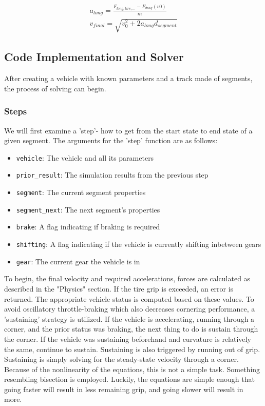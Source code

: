 \documentclass{article}
\begin{document}
\begin{align}
	a_{long} = \frac{F_{long,tire,...} - F_{drag}(v0)}{m} \\
	v_{final} = \sqrt{v_0^2 + 2 a_{long} d_{segment}}
\end{align}


\subsection{Code Implementation and Solver}

After creating a vehicle with known parameters and a track made of segments, the process of solving can begin. 

\subsubsection{Steps}

We will first examine a 'step'- how to get from the start state to end state of a given segment. The arguments for the 'step' function are as follows:

\begin{itemize}
\item \texttt{vehicle}: The vehicle and all its parameters
\item \texttt{prior\_result}: The simulation results from the previous step
\item \texttt{segment}: The current segment properties
\item \texttt{segment\_next}: The next segment's properties
\item \texttt{brake}: A flag indicating if braking is required
\item \texttt{shifting}: A flag indicating if the vehicle is currently shifting inbetween gears
\item \texttt{gear}: The current gear the vehicle is in
\end{itemize}

To begin, the final velocity and required accelerations, forces are calculated as described in the "Physics" section. If the tire grip is exceeded, an error is returned. The appropriate vehicle status is computed based on these values. To avoid oscillatory throttle-braking which also decreases cornering performance, a 'sustaining' strategy is utilized. If the vehicle is accelerating, running through a corner, and the prior status was braking, the next thing to do is sustain through the corner. If the vehicle was sustaining beforehand and curvature is relatively the same, continue to sustain. Sustaining is also triggered by running out of grip. Sustaining is simply solving for the steady-state velocity through a corner. Because of the nonlinearity of the equations, this is not a simple task. Something resembling bisection is employed. Luckily, the equations are simple enough that going faster will result in less remaining grip, and going slower will result in more.
\end{document}
